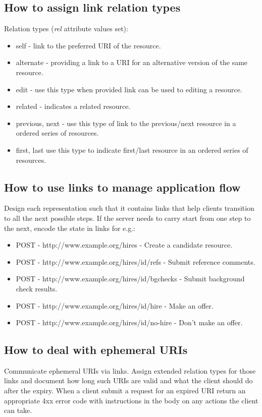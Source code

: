 \documentclass[11pt,a4paper]{article}
\begin{document}
\subsection{How to assign link relation types}
Relation types (\textit{rel} attribute values set):
\begin{itemize}
	\item self - link to the preferred URI of the resource.
	\item alternate - providing a link to a URI for an alternative version of the same resource.
	\item edit - use this type when provided link can be used to editing a resource.
	\item related - indicates a related resource.
	\item previous, next - use this type of link to the previous/next resource in a ordered series of resources.
	\item first, last use this type to indicate first/last resource in an ordered series of resources.
\end{itemize}

\subsection{How to use links to manage application flow}
Design each representation such that it contains links that help clients transition to all the next possible steps. If the server needs to carry start from one step to the next, encode the state in links for e.g.:
\begin{itemize}
	\item POST - http://www.example.org/hires - Create a candidate resource.
	\item POST - http://www.example.org/hires/{id}/refs - Submit reference comments.
	\item POST - http://www.example.org/hires/{id}/bgchecks - Submit background check results.
	\item POST - http://www.example.org/hires/{id}/hire - Make an offer.
	\item POST - http://www.example.org/hires/{id}/no-hire - Don't make an offer.
\end{itemize}

\subsection{How to deal with ephemeral URIs}
Communicate ephemeral URIs via links. Assign extended relation types for those links and document how long such URIs are valid and what the client should do after the expiry. When a client submit a request for an expired URI return an appropriate 4xx error code with instructions in the body on any actions the client can take.
\end{document}
